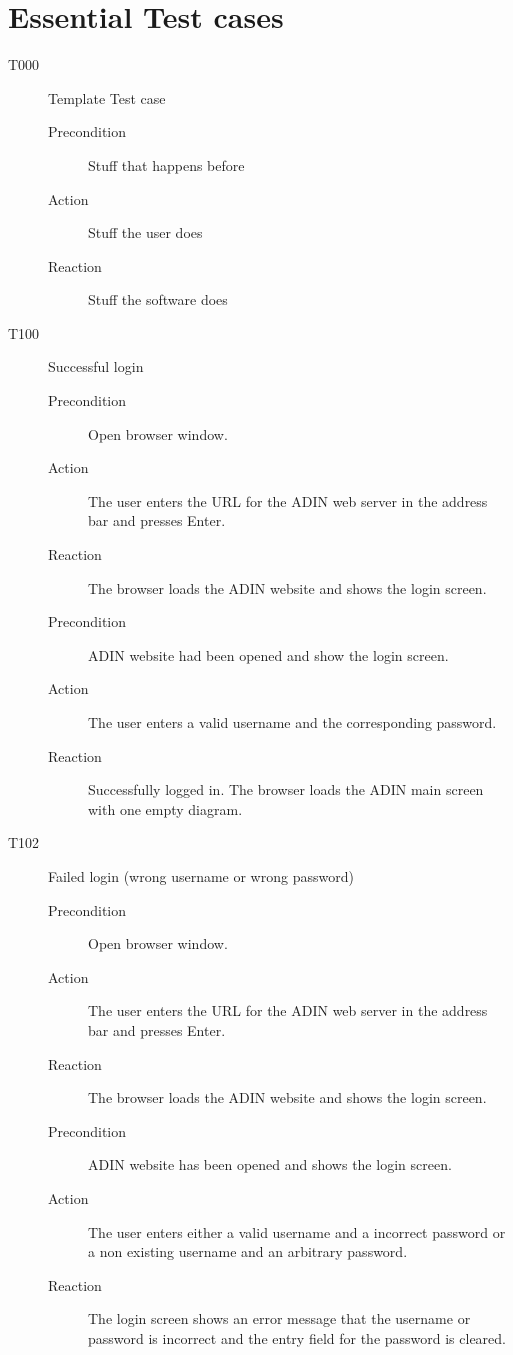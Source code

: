 \documentclass[twoside, english, draft]{Pflichtenheft}
\begin{document}
\section{Essential Test cases}

\begin{description}

  \item[T000] Template Test case
\begin{description}
    \item[Precondition]
	Stuff that happens before
    \item[Action]
    Stuff the user does
    \item[Reaction]
	Stuff the software does
\end{description}

  \item[T100] Successful login
\begin{description}
    \item[Precondition]
    Open browser window.
    \item[Action]
    The user enters the URL for the ADIN web server in the address bar and presses Enter.
    \item[Reaction]
    The browser loads the ADIN website and shows the login screen.

    \item[Precondition]
    ADIN website had been opened and show the login screen.
    \item[Action]
    The user enters a valid username and the corresponding password.
    \item[Reaction]
    Successfully logged in. The browser loads the ADIN main screen with one empty diagram.
\end{description}

  \item[T102] Failed login (wrong username or wrong password)
\begin{description}
    \item[Precondition]
    Open browser window.
    \item[Action]
    The user enters the URL for the ADIN web server in the address bar and presses Enter.
    \item[Reaction]
    The browser loads the ADIN website and shows the login screen.

    \item[Precondition]
    ADIN website has been opened and shows the login screen.
    \item[Action]
    The user enters either a valid username and a incorrect password or a non existing username and an arbitrary password.
    \item[Reaction]
    The login screen shows an error message that the username or password is incorrect and the entry field for the password is cleared.
\end{description}


\end{description}
\end{document}
